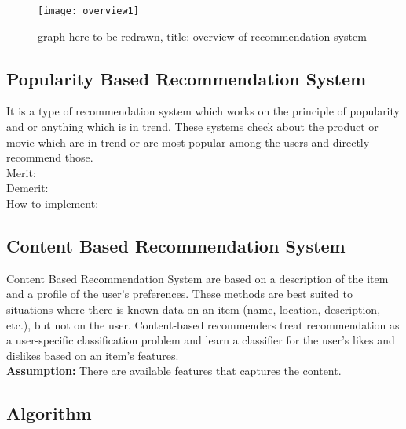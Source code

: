 \begin{figure}[ht]
\centering
\texttt{[image: overview1]}
\caption{graph here to be redrawn, title: overview of recommendation system}
\end{figure}

\subsection{Popularity Based Recommendation System}
It is a type of recommendation system which works on the principle of popularity and or anything which is in trend. These systems check about the product or movie which are in trend or are most popular among the users and directly recommend those.
\\ Merit:
\\ Demerit:
\\ How to implement:

\subsection{Content Based Recommendation System}
Content Based Recommendation System are based on a description of the item and a profile of the user's preferences. These methods are best suited to situations where there is known data on an item (name, location, description, etc.), but not on the user. Content-based recommenders treat recommendation as a user-specific classification problem and learn a classifier for the user's likes and dislikes based on an item's features.
\\ \textbf{Assumption:} There are available features that captures the content.
 
 \subsection*{Algorithm}
 
